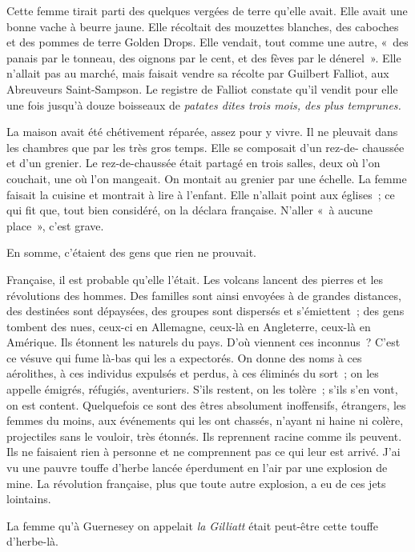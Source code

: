 \documentclass[french,twoside]{book} %
\begin{document}
Cette femme tirait parti des quelques vergées de terre qu’elle avait. Elle avait une bonne vache à beurre jaune. Elle récoltait des mouzettes blanches, des caboches et des pommes de terre Golden Drops. Elle vendait, tout comme une autre, « des panais par le tonneau, des oignons par le cent, et des fèves par le dénerel ». Elle n’allait pas au marché, mais faisait vendre sa récolte par Guilbert Falliot, aux Abreuveurs Saint-Sampson. Le registre de Falliot constate qu’il vendit pour elle une fois jusqu’à douze boisseaux de \emph{patates dites trois mois, des plus temprunes.}\par
La maison avait été chétivement réparée, assez pour y vivre. Il ne pleuvait dans les chambres que par les très gros temps. Elle se composait d’un rez-de- chaussée et d’un grenier. Le rez-de-chaussée était partagé en trois salles, deux où l’on couchait, une où l’on mangeait. On montait au grenier par une échelle. La femme faisait la cuisine et montrait à lire à l’enfant. Elle n’allait point aux églises ; ce qui fit que, tout bien considéré, on la déclara française. N’aller « à aucune place », c’est grave.\par
En somme, c’étaient des gens que rien ne prouvait.\par
Française, il est probable qu’elle l’était. Les volcans lancent des pierres et les révolutions des hommes. Des familles sont ainsi envoyées à de grandes distances, des destinées sont dépaysées, des groupes sont dispersés et s’émiettent ; des gens tombent des nues, ceux-ci en Allemagne, ceux-là en Angleterre, ceux-là en Amérique. Ils étonnent les naturels du pays. D’où viennent ces inconnus ? C’est ce vésuve qui fume là-bas qui les a expectorés. On donne des noms à ces aérolithes, à ces individus expulsés et perdus, à ces éliminés du sort ; on les appelle émigrés, réfugiés, aventuriers. S’ils restent, on les tolère ; s’ils s’en vont, on est content. Quelquefois ce sont des êtres absolument inoffensifs, étrangers, les femmes du moins, aux événements qui les ont chassés, n’ayant ni haine ni colère, projectiles sans le vouloir, très étonnés. Ils reprennent racine comme ils peuvent. Ils ne faisaient rien à personne et ne comprennent pas ce qui leur est arrivé. J’ai vu une pauvre touffe d’herbe lancée éperdument en l’air par une explosion de mine. La révolution française, plus que toute autre explosion, a eu de ces jets lointains.\par
 La femme qu’à Guernesey on appelait \emph{la Gilliatt }était peut-être cette touffe d’herbe-là.\par
\end{document}
